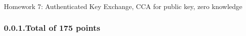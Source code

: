 \documentclass{article}
\begin{document}
\noindent{}Homework 7: Authenticated Key Exchange, CCA for public key, zero knowledge%

\newcommand{\zo}{\{0,1\}}
\newcommand{\E}{\mathbb{E}}
\newcommand{\Z}{\mathbb{Z}}
\newcommand{\getsr}{\leftarrow_R\;}
\newcommand{\Gp}{\mathbb{G}}
\newcommand{\iprod}[1]{\langle #1 \rangle}
\newcommand{\Epubcca}{E^{pub,cca}}
\newcommand{\Epubcpa}{E^{pub,cpa}}
\newcommand{\Epriv}{E^{priv,cca}}
\newcommand{\Sign}{S}
\newcommand{\Ver}{V}
\subsubsection{0.0.1.\hspace*{0.5em}Total of 175 points}\label{sec-total-of-175-points}%
\end{document}

